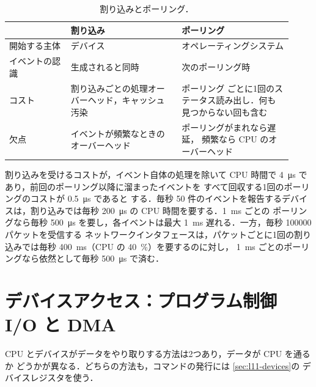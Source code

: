 \documentclass[../main.tex]{subfiles}
\begin{document}
\begin{table}[htbp]
  \centering
  \caption{割り込みとポーリング．}
  \label{tab:l11-int-poll}
  \small
  \begin{tabular}{@{}>{\raggedright\arraybackslash}p{0.2\linewidth}>{\raggedright\arraybackslash}p{0.36\linewidth}>{\raggedright\arraybackslash}p{0.36\linewidth}@{}}
    \toprule
    & 割り込み & ポーリング \\
    \midrule
    開始する主体 & デバイス & オペレーティングシステム \\
    イベントの認識 & 生成されると同時 & 次のポーリング時 \\
    コスト & 割り込みごとの処理オーバーヘッド，キャッシュ汚染 & ポーリング
      ごとに1回のステータス読み出し．何も見つからない回も含む \\
    欠点 & イベントが頻繁なときのオーバーヘッド & ポーリングがまれなら遅延，
      頻繁なら CPU のオーバーヘッド \\
    \bottomrule
  \end{tabular}
\end{table}

\begin{example}
  割り込みを受けるコストが，イベント自体の処理を除いて CPU 時間で
  \SI{4}{\micro\second} であり，前回のポーリング以降に溜まったイベントを
  すべて回収する1回のポーリングのコストが \SI{0.5}{\micro\second} であると
  する．毎秒 50 件のイベントを報告するデバイスは，割り込みでは毎秒
  \SI{200}{\micro\second} の CPU 時間を要する．\SI{1}{\milli\second} ごとの
  ポーリングなら毎秒 \SI{500}{\micro\second} を要し，各イベントは最大
  \SI{1}{\milli\second} 遅れる．一方，毎秒 \num{100000} パケットを受信する
  ネットワークインタフェースは，パケットごとに1回の割り込みでは毎秒
  \SI{400}{\milli\second}（CPU の \SI{40}{\percent}）を要するのに対し，
  \SI{1}{\milli\second} ごとのポーリングなら依然として毎秒
  \SI{500}{\micro\second} で済む．
\end{example}

\section{デバイスアクセス：プログラム制御 I/O と DMA}
\label{sec:l11-pio-dma}

CPU とデバイスがデータをやり取りする方法は2つあり，データが CPU を通るか
どうかが異なる．どちらの方法も，コマンドの発行には \cref{sec:l11-devices}の
デバイスレジスタを使う．
\end{document}

